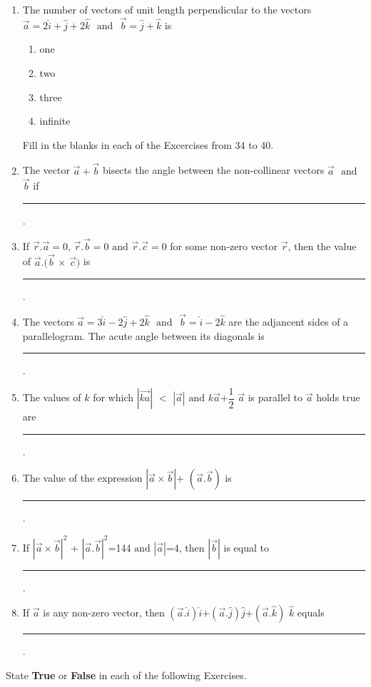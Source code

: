 \documentclass{article}
\providecommand{\abs}[1]{\left\vert#1\right\vert}
\begin{document}
\begin{enumerate}
\item The number of vectors of unit length perpendicular to the vectors $\vec{a}=2\hat{i}+\hat{j}+2\hat{k}$ $\text{ and }$ $\vec{b}=\hat{j}+\hat{k}$ is
	\begin{enumerate}
\item one
\item  two
\item three
\item infinite
\end{enumerate}

\begin{flushleft}Fill in the blanks in each of the Excercises from 34 to 40.\end{flushleft}

\item The vector $\vec{a}+\vec{b}$ bisects the angle between the non-collinear vectors $\vec{a}$ $\text{ and }$ $\vec{b}$ if \rule{1cm}{0.15mm}.


\item If $\vec{r}.\vec{a}=0$, $\vec{r}.\vec{b}=0$ $\text{and}$ $\vec{r}.\vec{c}=0$ for some non-zero vector $\vec{r}$, then the value of $\vec{a}.(\vec{b}$ $\times$ $\vec{c})$ is \rule{1cm}{0.15mm}.


\item The vectors $\vec{a}=3\hat{i}-2\hat{j}+2\hat{k}$ $\text{ and }$ $\vec{b}=\hat{i}-2\hat{k}$ are the adjancent sides of a parallelogram. The acute angle between its diagonals is \rule{1cm}{0.15mm}.


\item The values of $k$ for which $\abs{\vec{ka}}$ $<$ $\abs{\vec{a}}$ $\text{and}$ $k\vec{a}$+$\dfrac{1}{2}$ $\vec{a}$ is parallel to $\vec{a}$ holds true are \rule{1cm}{0.15mm}.


\item The value of the expression $\abs{\vec{a}\times\vec{b}}$+ $({\vec{a}.\vec{b}})$ is \rule{1cm}{0.15mm}.


\item If $\abs{\vec{a}\times\vec{b}}^2$ + $\abs{\vec{a}.\vec{b}}^2$=144 $\text{and}$  $\abs{\vec{a}}$=4, then $\abs{\vec{b}}$ is equal to \rule{1cm}{0.15mm}.


\item If $\vec{a}$ is  any non-zero vector, then $(\vec{a}.\hat{i})\hat{i}$+$(\vec{a}.\hat{j})\hat{j}$+$(\vec{a}.\hat{k})$ $\hat{k}$ equals \rule{1cm}{0.15mm}.

\end{enumerate}

State \textbf{True} or \textbf{False} in each of the following Exercises.
\end{document}
